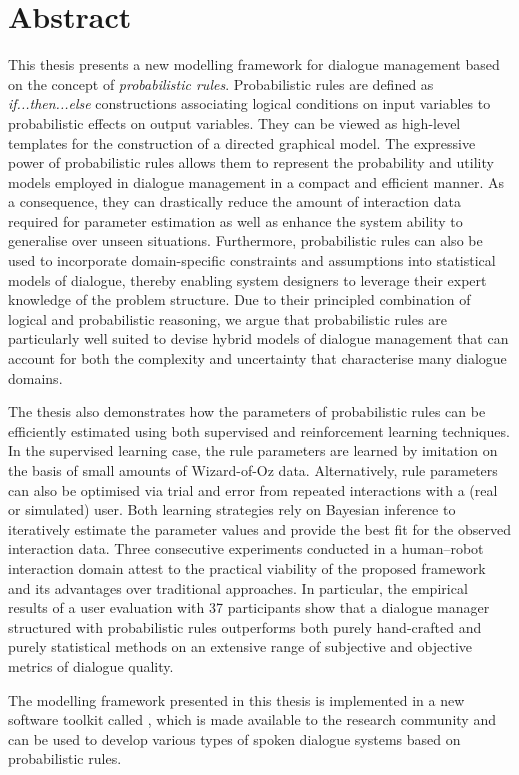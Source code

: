 \chapter*{Abstract}

This thesis presents a new modelling framework for dialogue management based on the concept of \textit{probabilistic rules}.  Probabilistic rules are defined as \textit{if...then...else} constructions associating logical conditions on input variables to probabilistic effects on output variables. They can be viewed as high-level templates for the construction of a directed graphical model. The expressive power of probabilistic rules allows them to represent the probability and utility models employed in dialogue management in a compact and efficient manner. As a consequence, they can drastically reduce the amount of interaction data required for parameter estimation as well as enhance the system ability to generalise over unseen situations. Furthermore, probabilistic rules can also be used to incorporate domain-specific constraints and assumptions into statistical models of dialogue, thereby enabling system designers to leverage their expert knowledge of the problem structure.  Due to their principled combination of logical and probabilistic reasoning, we argue that probabilistic rules are particularly well suited to devise hybrid models of dialogue management that can account for both the complexity and uncertainty that characterise many dialogue domains.


The thesis also demonstrates how the parameters of probabilistic rules can be efficiently estimated using both supervised and reinforcement learning techniques. In the supervised learning case, the rule parameters are learned by imitation on the basis of small amounts of Wizard-of-Oz data.  Alternatively, rule parameters can also be optimised via trial and error from repeated interactions with a (real or simulated) 
user. Both learning strategies rely on Bayesian inference to iteratively estimate the parameter values and provide the best fit for the observed interaction data. Three consecutive experiments conducted in a human--robot interaction domain attest to the practical viability of the proposed framework and its advantages over traditional approaches.  In particular, the empirical results of a user evaluation with 37 participants show that a dialogue manager structured with probabilistic rules outperforms both purely hand-crafted and purely statistical methods on an extensive range of subjective and objective metrics of dialogue quality.

The modelling framework presented in this thesis is implemented in a new software toolkit called \opendial{}, which is made available to the research community and can be used to develop various types of spoken dialogue systems based on probabilistic rules. 
